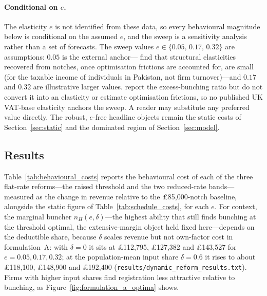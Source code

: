 \paragraph{Conditional on $e$.} The elasticity $e$ is not identified from
these data, so every behavioural magnitude below is conditional on the assumed
$e$, and the sweep is a sensitivity analysis rather than a set of forecasts.
The sweep values $e\in\{0.05,\,0.17,\,0.32\}$ are assumptions: $0.05$ is
the external anchor---\citet{klevenwaseem2013} find that structural
elasticities recovered from notches, once optimisation frictions are
accounted for, are small (for the taxable income of individuals in Pakistan,
not firm turnover)---and $0.17$ and $0.32$ are illustrative larger values. \citet{liuetal2021} report the
excess-bunching ratio but do not convert it into an elasticity or estimate
optimisation frictions, so no published UK VAT-base elasticity anchors the
sweep. A reader may substitute any preferred value directly.
The robust, $e$-free headline objects remain the static costs of
Section~\ref{sec:static} and the dominated region of Section~\ref{sec:model}.

\subsection{Results}
\label{ssec:behavioural-results}

Table~\ref{tab:behavioural_costs} reports the behavioural cost of each of the
three flat-rate reforms---the raised threshold and the two reduced-rate
bands---measured as the change in revenue relative to the
\pounds85{,}000-notch baseline, alongside the static figure of
Table~\ref{tab:schedule_costs}, for each $e$. For context, the marginal
buncher $n_H(e,\delta)$---the highest ability that still finds bunching at the
threshold optimal, the extensive-margin object held fixed here---depends on the
deductible share, because $\delta$ scales revenue but not own-factor cost in
formulation~A: with $\delta=0$ it sits at \pounds112{,}795, \pounds127{,}382
and \pounds143{,}527 for $e=0.05, 0.17, 0.32$; at the population-mean input
share $\delta=0.6$ it rises to about \pounds118{,}100, \pounds148{,}900 and
\pounds192{,}400 (\texttt{results/dynamic\_reform\_results.txt}). Firms with
higher input shares find registration less attractive relative to bunching, as
Figure~\ref{fig:formulation_a_optima} shows.

